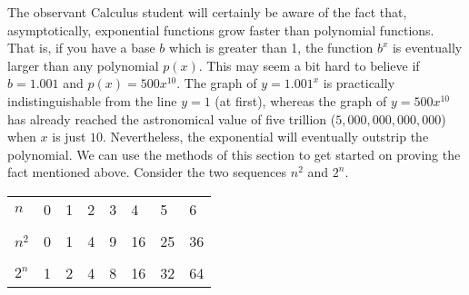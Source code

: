 \documentclass[10pt,]{book}
\theoremstyle{plain}
\theoremstyle{definition}
\theoremstyle{definition}
\numberwithin{equation}{section}
\newcommand{\hrulethin}  {\noalign{\hrule height 0.04em}}
\begin{document}
    The observant Calculus student will certainly be aware of the fact
    that, asymptotically, exponential functions grow faster than polynomial
    functions. That is, if you have a base \(b\) which is greater than 1, the
    function \(b^x\) is eventually larger than any polynomial \(p(x)\). This
    may seem a bit hard to believe if \(b=1.001\) and \(p(x) = 500x^{10}\). The
    graph of \(y=1.001^x\) is practically indistinguishable from the line \(y=1\)
    (at first), whereas the graph of \(y=500x^{10}\) has already reached the
    astronomical value of five trillion (\(5,000,000,000,000\)) when \(x\) is just
    \(10\). Nevertheless, the exponential will eventually outstrip the polynomial.
    We can use the methods of this section to get started on proving the fact
    mentioned above. Consider the two sequences \(n^2\) and \(2^n\).
\begin{tabular}{llllllll}
\(n\)&0&1&2&3&4&5&6\tabularnewline[0pt]
&&&&&&&\tabularnewline\hrulethin
\(n^2\)&0&1&4&9&16&25&36\tabularnewline[0pt]
&&&&&&&\tabularnewline\hrulethin
\(2^n\)&1&2&4&8&16&32&64
\end{tabular}
\par
\end{document}
